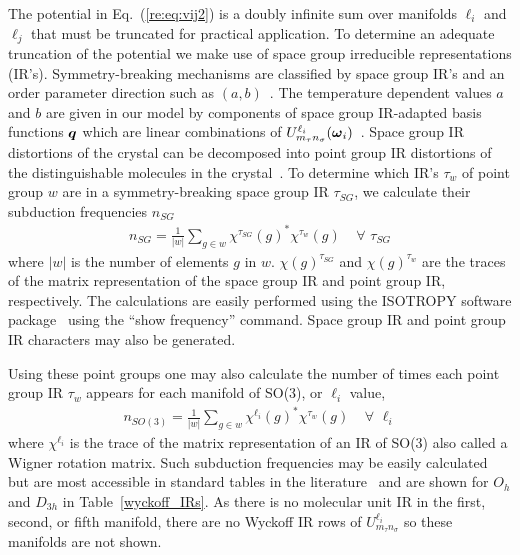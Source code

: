 \documentclass[preprint]{revtex4}
\newcommand{\mb}[1]{\ensuremath{\mbox{\boldmath $ #1 $}}}
\begin{document}
The potential in Eq.~(\ref{re:eq:vij2}) is a doubly infinite sum over
manifolds $\ell_i$ and $\ell_j$ that must be truncated for practical
application. To determine an adequate truncation of the potential we
make use of space group irreducible representations (IR's).
Symmetry-breaking mechanisms are classified by space group IR's and
an order parameter direction such as $(a,b)$~\cite{Stokes02b}.  The
temperature dependent values $a$ and $b$ are given in our model by
components of space group IR-adapted basis functions $\mb{q}$ which
are linear combinations of $U^{\ell_i}_{m_\tau
n_\sigma}(\mb{\omega}_i)$~\cite{Mettes04}. Space group IR
distortions of the crystal can be decomposed into point group IR
distortions of the distinguishable molecules in the
crystal~\cite{Stokes91}. To determine which IR's $\tau_w$ of point
group $w$ are in a symmetry-breaking space group IR $\tau_{SG}$, we
calculate their subduction frequencies $n_{SG}$
\begin{eqnarray}
\label{subduction1} n_{SG}=\frac{1}{|w|}\sum_{g\in
w}\chi^{\tau_{SG}}(g)^*\chi^{\tau_w}(g)\;\;\;\;\forall\,\,\tau_{SG}
\end{eqnarray}
where $|w|$ is the number of elements $g$ in $w$.
$\chi(g)^{\tau_{SG}}$ and $\chi(g)^{\tau_w}$ are the traces of the
matrix representation of the space group IR and point group IR,
respectively. The calculations are easily performed using the
{I\small SOTROPY} software package~\cite{Stokes02b} using the ``show
frequency'' command. Space group IR and point group IR characters
may also be generated.

Using these point groups one may also calculate the number of times
each point group IR $\tau_w$ appears for each manifold of SO(3), or
$\ell_i$ value,
\begin{eqnarray}
\label{subduction2} n_{SO(3)}=\frac{1}{|w|}\sum_{g\in
w}\chi^{\ell_i}(g)^*\chi^{\tau_w}(g)\;\;\;\;\forall\,\,\ell_i
\end{eqnarray}
where $\chi^{\ell_i}$ is the trace of the matrix representation of
an IR of SO(3) also called a Wigner rotation matrix. Such subduction
frequencies may be easily calculated but are most accessible in
standard tables in the literature~\cite{Bradley72} and are shown for
$O_h$ and $D_{3h}$ in Table~\ref{wyckoff_IRs}.  As there is no
molecular unit IR in the first, second, or fifth manifold, there are
no Wyckoff IR rows of $U^{\ell_i}_{m_\tau n_\sigma}$ so these
manifolds are not shown.
\end{document}
